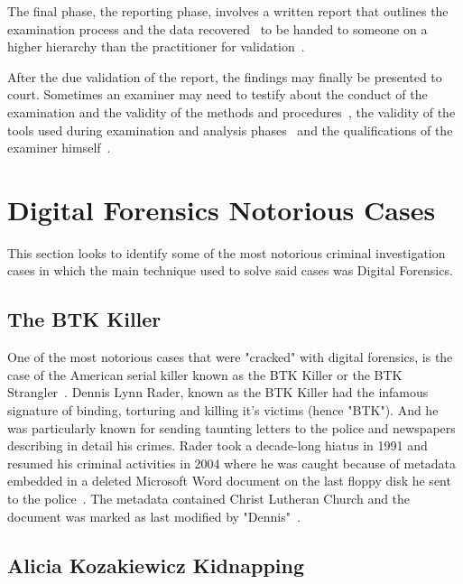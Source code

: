 The final phase, the reporting phase, involves a written report that outlines the examination process and the data recovered~\cite{ballou2010electronic} to be handed to someone on a higher hierarchy than the practitioner for validation~\cite{casey2009handbook}.

After the due validation of the report, the findings may finally be presented to court. Sometimes an examiner may need to testify about the conduct of the examination and the validity of the methods and procedures~\cite{ballou2010electronic}, the validity of the tools used during examination and analysis phases~\cite{casey2009handbook} and the qualifications of the examiner himself~\cite{ballou2010electronic}.

\section{Digital Forensics Notorious Cases}

This section looks to identify some of the most notorious criminal investigation cases in which the main technique used to solve said cases was Digital Forensics.

\subsection{The BTK Killer}

One of the most notorious cases that were "cracked" with digital forensics, is the case of the American serial killer known as the BTK Killer or the BTK Strangler~\cite{siegel1998criminology}. Dennis Lynn Rader, known as the BTK Killer had the infamous signature of binding, torturing and killing it's victims (hence "BTK"). And he was particularly known for sending taunting letters to the police and newspapers describing in detail his crimes. Rader took a decade-long hiatus in 1991 and resumed his criminal activities in 2004 where he was caught because of metadata embedded in a deleted Microsoft Word document on the last floppy disk he sent to the police~\cite{girard2017criminalistics}. The metadata contained Christ Lutheran Church and the document was marked as last modified by "Dennis"~\cite{bardsley2005btk}.

\subsection{Alicia Kozakiewicz Kidnapping}


